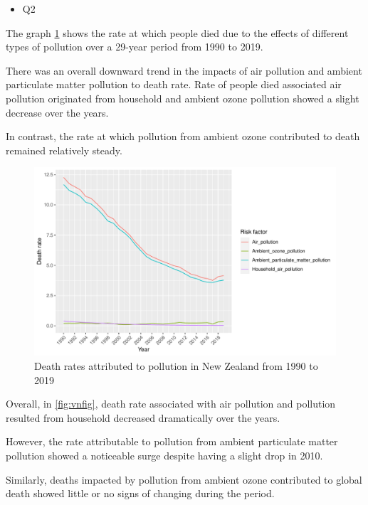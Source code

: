 \documentclass[11pt,a4paper,]{article}
\providecommand{\tightlist}{%
  \setlength{\itemsep}{0pt}\setlength{\parskip}{0pt}}
\begin{document}
\begin{itemize}
\tightlist
\item
  Q2
\end{itemize}

The graph \ref{fig:nzfig} shows the rate at which people died due to the effects of different types of pollution over a 29-year period from 1990 to 2019.

There was an overall downward trend in the impacts of air pollution and ambient particulate matter pollution to death rate.
Rate of people died associated air pollution originated from household and ambient ozone pollution showed a slight decrease over the years.

In contrast, the rate at which pollution from ambient ozone contributed to death remained relatively steady.

\begin{figure}[H]

{\centering \includegraphics{Assignment4_files/figure-latex/nzfig-1} 

}

\caption{Death rates attributed to pollution in New Zealand from 1990 to 2019}\label{fig:nzfig}
\end{figure}

Overall, in \ref{fig:vnfig}, death rate associated with air pollution and pollution resulted from household decreased dramatically over the years.

However, the rate attributable to pollution from ambient particulate matter pollution showed a noticeable surge despite having a slight drop in 2010.

Similarly, deaths impacted by pollution from ambient ozone contributed to global death showed little or no signs of changing during the period.
\end{document}
